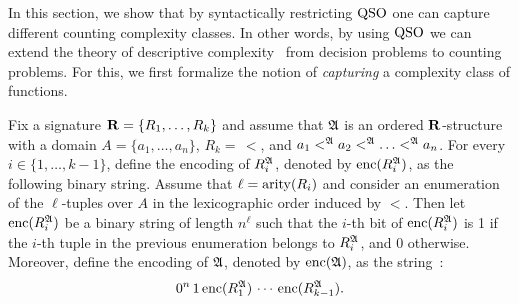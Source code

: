 
In this section, we show that by syntactically restricting ${\rm QSO}$ one can capture different counting complexity classes. 
In other words, by using ${\rm QSO}$ we can extend the theory of descriptive complexity~\cite{immerman1999descriptive} from decision problems to counting problems. 
For this, we first formalize the notion of \emph{capturing} a complexity class of functions.

Fix a signature $\mathbf{R} = \{R_1, \ldots, R_k\}$ and assume that $\mathfrak{A}$ is an ordered $\mathbf{R}$-structure with a domain $A = \{a_1, \ldots, a_n\}$, $R_k =\, <$, and $a_1 <^{\mathfrak{A}} a_2 <^{\mathfrak{A}} \ldots <^{\mathfrak{A}} a_n$. For every $i \in \{1, \ldots, k-1\}$, define the encoding of $R_i^{\mathfrak{A}}$, denoted by ${\rm enc}(R_i^{\mathfrak{A}})$, as the following binary string. Assume that $\ell = {\rm arity}(R_i)$ and consider an enumeration of the $\ell$-tuples over $A$ in the lexicographic order induced by $<$. 
Then let ${\rm enc}(R_i^{\mathfrak{A}})$ be a binary string of length $n^\ell$ such that the $i$-th bit of ${\rm enc}(R_i^{\mathfrak{A}})$ is 1 if the $i$-th tuple in the previous enumeration belongs to $R_i^{\mathfrak{A}}$, and 0 otherwise. Moreover, define the encoding of $\mathfrak{A}$, denoted by ${\rm enc}(\mathfrak{A})$, as the string~\cite{L04}:
$$
0^n \, 1 \, {\rm enc}(R_1^{\mathfrak{A}}) \, \cdots \, {\rm enc}(R_{k-1}^{\mathfrak{A}}).
$$


